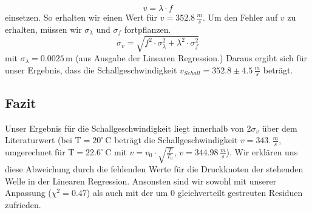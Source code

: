 \documentclass[12pt,a4paper]{article}
\begin{document}
\begin{equation*}
v = \lambda\cdot f
\end{equation*}
einsetzen. So erhalten wir einen Wert für $v = 352.8\,\frac{m}{s}$.
Um den Fehler auf $v$ zu erhalten, müssen wir $\sigma_{\lambda}$ und $\sigma_f$ fortpflanzen.
\begin{equation}
\sigma_{v} = \sqrt{f^2\cdot\sigma_{\lambda}^2 + \lambda^2\cdot\sigma_{f}^2}
\end{equation}
mit $\sigma_{\lambda} = 0.0025\,$m (aus Ausgabe der Linearen Regression.)
Daraus ergibt sich für unser Ergebnis, dass die Schallgeschwindigkeit $v_{Schall} = 352.8 \pm 4.5\,\frac{m}{s}$ beträgt.

\subsection{Fazit}
Unser Ergebnis für die Schallgeschwindigkeit liegt innerhalb von 2$\sigma_{v}$ über dem Literaturwert (bei T$ = 20^{\circ}\,$C beträgt die Schallgeschwindigkeit $v = 343.\,\frac{m}{s}$, umgerechnet für T$ = 22.6^{\circ}\,$C mit $v = v_0\cdot\sqrt{\frac{T}{T_0}}$, $v = 344.98\,\frac{m}{s}$). Wir erklären uns diese Abweichung durch die fehlenden Werte für die Druckknoten der stehenden Welle in der Linearen Regression. Ansonsten sind wir sowohl mit unserer Anpassung ($\chi^2 = 0.47$) als auch mit der um 0 gleichverteilt gestreuten Residuen zufrieden.
\end{document}
